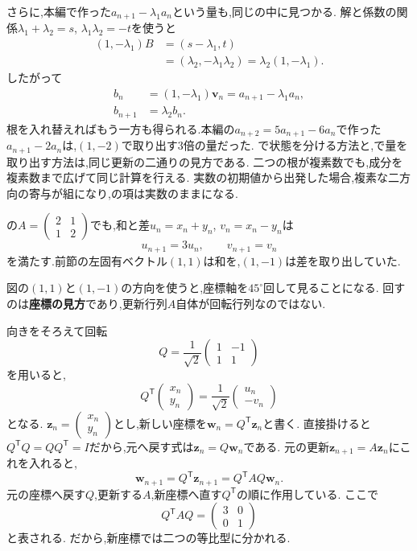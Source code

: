 さらに,本編で作った$a_{n+1}-\lambda_1a_n$という量も,同じの中に見つかる.
解と係数の関係$\lambda_1+\lambda_2=s$, $\lambda_1\lambda_2=-t$を使うと
\[
  \begin{aligned}
    (1,-\lambda_1)B
    &=(s-\lambda_1,t)\\
    &=(\lambda_2,-\lambda_1\lambda_2)
    =\lambda_2(1,-\lambda_1).
  \end{aligned}
\]
したがって
\[
  \begin{aligned}
    b_n&=(1,-\lambda_1)\boldsymbol{v}_n
    =a_{n+1}-\lambda_1a_n,\\
    b_{n+1}&=\lambda_2 b_n.
  \end{aligned}
\]
根を入れ替えればもう一方も得られる.本編の$a_{n+2}=5a_{n+1}-6a_n$で作った$a_{n+1}-2a_n$は,$(1,-2)$で取り出す$3$倍の量だった.
で状態を分ける方法と,で量を取り出す方法は,同じ更新の二通りの見方である.
二つの根が複素数でも,成分を複素数まで広げて同じ計算を行える.
実数の初期値から出発した場合,複素な二方向の寄与が組になり,の項は実数のままになる.

の$A=\begin{pmatrix}2&1\\1&2\end{pmatrix}$でも,和と差$u_n=x_n+y_n$, $v_n=x_n-y_n$は
\[
  u_{n+1}=3u_n,\qquad v_{n+1}=v_n
\]
を満たす.前節の左固有ベクトル$(1,1)$は和を,$(1,-1)$は差を取り出していた.

図の$(1,1)$と$(1,-1)$の方向を使うと,座標軸を$45^\circ$回して見ることになる.
回すのは\textbf{座標の見方}であり,更新行列$A$自体が回転行列なのではない.
\BookFigSystem

向きをそろえて回転
\[
  Q=\frac{1}{\sqrt2}
  \begin{pmatrix}
    1&-1\\
    1&1
  \end{pmatrix}
\]
を用いると,
\[
  Q^{\mathsf T}
  \begin{pmatrix}x_n\\y_n\end{pmatrix}
  =\frac{1}{\sqrt2}
  \begin{pmatrix}u_n\\-v_n\end{pmatrix}
\]
となる.
$\boldsymbol z_n=\begin{pmatrix}x_n\\y_n\end{pmatrix}$とし,新しい座標を$\boldsymbol w_n=Q^{\mathsf T}\boldsymbol z_n$と書く.
直接掛けると$Q^{\mathsf T}Q=QQ^{\mathsf T}=I$だから,元へ戻す式は$\boldsymbol z_n=Q\boldsymbol w_n$である.
元の更新$\boldsymbol z_{n+1}=A\boldsymbol z_n$にこれを入れると,
\[
  \boldsymbol w_{n+1}
  =Q^{\mathsf T}\boldsymbol z_{n+1}
  =Q^{\mathsf T}AQ\boldsymbol w_n.
\]
元の座標へ戻す$Q$,更新する$A$,新座標へ直す$Q^{\mathsf T}$の順に作用している.
ここで
\[
  Q^{\mathsf T}AQ=
  \begin{pmatrix}3&0\\0&1\end{pmatrix}
\]
と表される.
だから,新座標では二つの等比型に分かれる.


